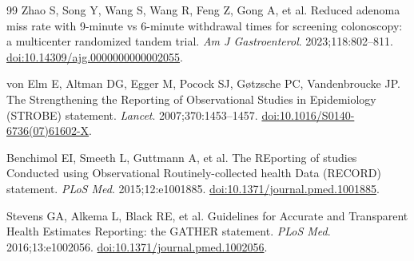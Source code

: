 \documentclass[10pt,a4paper]{article}
\begin{document}
\begin{thebibliography}{99}
Zhao S, Song Y, Wang S, Wang R, Feng Z, Gong A, et al.
Reduced adenoma miss rate with 9-minute vs 6-minute withdrawal times for
screening colonoscopy: a multicenter randomized tandem trial.
\textit{Am J Gastroenterol}. 2023;118:802--811.
\href{https://doi.org/10.14309/ajg.0000000000002055}{doi:10.14309/ajg.0000000000002055}.

von Elm E, Altman DG, Egger M, Pocock SJ, G\o tzsche PC,
Vandenbroucke JP.
The Strengthening the Reporting of Observational Studies in Epidemiology
(STROBE) statement.
\textit{Lancet}. 2007;370:1453--1457.
\href{https://doi.org/10.1016/S0140-6736(07)61602-X}{doi:10.1016/S0140-6736(07)61602-X}.

Benchimol EI, Smeeth L, Guttmann A, et al.
The REporting of studies Conducted using Observational Routinely-collected
health Data (RECORD) statement.
\textit{PLoS Med}. 2015;12:e1001885.
\href{https://doi.org/10.1371/journal.pmed.1001885}{doi:10.1371/journal.pmed.1001885}.

Stevens GA, Alkema L, Black RE, et al.
Guidelines for Accurate and Transparent Health Estimates Reporting: the
GATHER statement.
\textit{PLoS Med}. 2016;13:e1002056.
\href{https://doi.org/10.1371/journal.pmed.1002056}{doi:10.1371/journal.pmed.1002056}.

\end{thebibliography}
\end{document}
